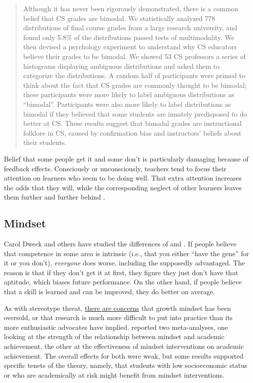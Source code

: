 \begin{quote}

  Although it has never been rigorously demonstrated, there is a
  common belief that CS grades are bimodal. We statistically analyzed
  778 distributions of final course grades from a large research
  university, and found only 5.8\% of the distributions passed tests
  of multimodality.  We then devised a psychology experiment to
  understand why CS educators believe their grades to be bimodal. We
  showed 53 CS professors a series of histograms displaying ambiguous
  distributions and asked them to categorize the distributions. A
  random half of participants were primed to think about the fact that
  CS grades are commonly thought to be bimodal; these participants
  were more likely to label ambiguous distributions as ``bimodal''.
  Participants were also more likely to label distributions as bimodal
  if they believed that some students are innately predisposed to do
  better at CS. These results suggest that bimodal grades are
  instructional folklore in CS, caused by confirmation bias and
  instructors' beliefs about their students.

\end{quote}

Belief that some people get it and some don't is particularly damaging
because of feedback effects.  Consciously or unconsciously, teachers
tend to focus their attention on learners who seem to be doing well.
That extra attention increases the odds that they will, while the
corresponding neglect of other learners leaves them further and
further behind \cite{Alvi1999,Brop1983,Juss2005}.

\subsection*{Mindset}

Carol Dweck and others have studied the differences of
 and
. If people believe that
competence in some area is intrinsic (i.e., that you either ``have the
gene'' for it or you don't), \emph{everyone} does worse, including the
supposedly advantaged. The reason is that if they don't get it at
first, they figure they just don't have that aptitude, which biases
future performance. On the other hand, if people believe that a skill
is learned and can be improved, they do better on average.

As with stereotype threat,
\href{https://educhatter.wordpress.com/2017/03/26/growth-mindset-is-the-theory-flawed-or-has-gm-been-debased-in-the-classroom/}{there
  are concerns} that growth mindset has been oversold, or that
research is much more difficult to put into practice than its more
enthusiastic advocates have implied.  \cite{Sisk2018} reported two
meta-analyses, one looking at the strength of the relationship between
mindset and academic achievement, the other at the effectiveness of
mindset interventions on academic achievement.  The overall effects
for both were weak, but some results supported specific tenets of the
theory, namely, that students with low socioeconomic status or who are
academically at risk might benefit from mindset interventions.

